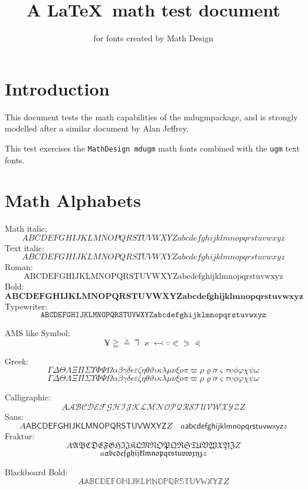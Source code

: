 \documentclass[fleqn]{article}
\title{A \LaTeX\ math test document}
\author{for fonts created by Math Design}
\let\omicron=o
\begin{document}
\maketitle

\section*{Introduction}

This document tests the math capabilities of the mdugmpackage, and is
strongly modelled after a similar document by Alan Jeffrey.

This test exercises the {\tt MathDesign mdugm} math fonts combined with the
{\tt ugm} text fonts.

\section*{Math Alphabets}

Math italic:
$$
   ABCDEFGHIJKLMNOPQRSTUVWXYZ
   abcdefghijklmnopqrstuvwxyz
$$
Text italic:
$$
   \mathit{ABCDEFGHIJKLMNOPQRSTUVWXYZ
      abcdefghijklmnopqrstuvwxyz}
$$
Roman:
$$
   \mathrm{ABCDEFGHIJKLMNOPQRSTUVWXYZ
      abcdefghijklmnopqrstuvwxyz}
$$
Bold:
$$
   \mathbf{ABCDEFGHIJKLMNOPQRSTUVWXYZ
      abcdefghijklmnopqrstuvwxyz}
$$
Typewriter:
$$
   \mathtt{ABCDEFGHIJKLMNOPQRSTUVWXYZ
      abcdefghijklmnopqrstuvwxyz}
$$

AMS like Symbol:
$$
   \yen \geqq \circeq \daleth \varkappa \leftarrowtail \because
   \eqslantless  \eqslantgtr \curlyeqprec
$$

Greek:
$$
   \Gamma\Delta\Theta\Lambda\Xi\Pi\Sigma\Upsilon\Phi\Psi\Omega
  \alpha\beta\gamma\delta\epsilon\varepsilon\zeta\eta\theta\vartheta
   \iota\kappa\lambda\mu\nu\xi\omicron\pi\varpi\rho\varrho
   \sigma\varsigma\tau\upsilon\phi\varphi\chi\psi\omega
$$
{
$$
       \Gamma\Delta\Theta\Lambda\Xi\Pi\Sigma\Upsilon\Phi\Psi\Omega
  \alpha\beta\gamma\delta\epsilon\varepsilon\zeta\eta\theta\vartheta
   \iota\kappa\lambda\mu\nu\xi\omicron\pi\varpi\rho\varrho
   \sigma\varsigma\tau\upsilon\phi\varphi\chi\psi\omega
$$}

Calligraphic:
$$A\mathcal{ABCDEFGHIJKLMNOPQRSTUVWXYZ}Z$$
Sans:
$$
   A\mathsf{ABCDEFGHIJKLMNOPQRSTUVWXYZ}Z \quad
      a\mathsf{abcdefghijklmnopqrstuvwxyz}z
$$
Fraktur:
$$
   A\mathfrak{ABCDEFGHIJKLMNOPQRSTUVWXYZ}Z 
$$
$$
   a\mathfrak{abcdefghijklmnopqrstuvwxyz}z
$$

Blackboard Bold:
$$
   A\mathbb{ABCDEFGHIJKLMNOPQRSTUVWXYZ}Z
$$
\end{document}

